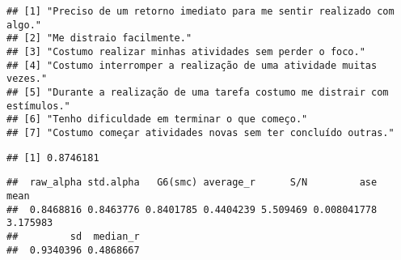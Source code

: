 \documentclass[
]{article}
\newenvironment{Shaded}{\begin{snugshade}}{\end{snugshade}}
\newcommand{\AttributeTok}[1]{\textcolor[rgb]{0.77,0.63,0.00}{#1}}
\newcommand{\CommentTok}[1]{\textcolor[rgb]{0.56,0.35,0.01}{\textit{#1}}}
\newcommand{\ConstantTok}[1]{\textcolor[rgb]{0.00,0.00,0.00}{#1}}
\newcommand{\DecValTok}[1]{\textcolor[rgb]{0.00,0.00,0.81}{#1}}
\newcommand{\FunctionTok}[1]{\textcolor[rgb]{0.00,0.00,0.00}{#1}}
\newcommand{\NormalTok}[1]{#1}
\newcommand{\OtherTok}[1]{\textcolor[rgb]{0.56,0.35,0.01}{#1}}
\newcommand{\SpecialCharTok}[1]{\textcolor[rgb]{0.00,0.00,0.00}{#1}}
\begin{document}
\begin{verbatim}
## [1] "Preciso de um retorno imediato para me sentir realizado com algo."    
## [2] "Me distraio facilmente."                                              
## [3] "Costumo realizar minhas atividades sem perder o foco."                
## [4] "Costumo interromper a realização de uma atividade muitas vezes."      
## [5] "Durante a realização de uma tarefa costumo me distrair com estímulos."
## [6] "Tenho dificuldade em terminar o que começo."                          
## [7] "Costumo começar atividades novas sem ter concluído outras."
\end{verbatim}

\begin{Shaded}
\end{Shaded}

\begin{verbatim}
## [1] 0.8746181
\end{verbatim}

\begin{Shaded}
\end{Shaded}

\begin{verbatim}
##  raw_alpha std.alpha   G6(smc) average_r      S/N         ase     mean
##  0.8468816 0.8463776 0.8401785 0.4404239 5.509469 0.008041778 3.175983
##         sd  median_r
##  0.9340396 0.4868667
\end{verbatim}
\end{document}
